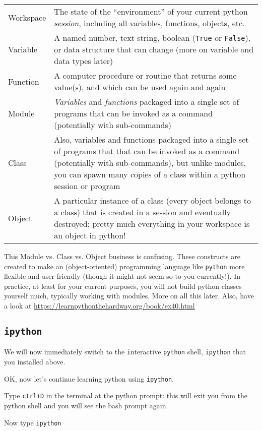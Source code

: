 \begin{tabular}{p{2.2cm} p{12cm}} 
	Workspace & The state of the ``environment'' of your current python 
	{\it session}, including all variables, functions, objects, etc. \\ 
	Variable & A named number, text string, boolean ({\tt True} or {\tt False}), or data 
	structure that can change (more on variable	and data types later)\\
	Function &  A computer procedure or routine that returns some value(s), 
	and which can be used again and again \\
	Module & {\it Variables} and {\it functions} packaged into a single 
	set of programs that can be invoked as a command (potentially with sub-commands)  \\
	Class &  Also, variables and functions packaged into a single set of programs 
	that that can be invoked as a command (potentially with sub-commands), but unlike modules, you can spawn many 
	copies of a class within a python session or program\\
	Object & A particular instance of a class (every object belongs to a 
	class) that is created in  a session and eventually destroyed; 
	pretty much everything in your workspace is an object in python!  \\
\end{tabular}
This Module vs. Class vs. Object business is confusing. These 
constructs are created to make an (object-oriented) programming 
language like {\tt python} more flexible and user friendly (though it 
might not seem so to you currently!). In practice, at least for your 
current purposes, you will not build python classes yourself much, 
typically working with modules. More on all this later. Also, have a 
look at \url{https://learnpythonthehardway.org/book/ex40.html}

\subsection{\tt ipython}
We will now immediately switch to the {\tt i}nteractive {\tt python} 
shell, {\tt ipython} that you installed above. 

OK, now let's continue learning python using {\tt ipython}. 
\begin{compactitem}[$\quad\star$]\itemsep4pt{}
\item Type {\tt ctrl+D} in the terminal at the python prompt: this will 
exit you from the python shell and you will see the bash prompt again. 
\item Now type {\tt ipython}  
\end{compactitem}

